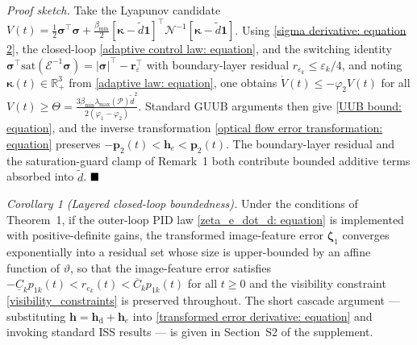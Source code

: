 \textit{Proof sketch.} Take the Lyapunov candidate $V(t) = \tfrac12\boldsymbol{\sigma}^\top\boldsymbol{\sigma} + \tfrac{\beta_{\min}}{2}[\boldsymbol{\kappa}-\tilde{d}\boldsymbol{1}]^\top\mathcal{N}^{-1}[\boldsymbol{\kappa}-\tilde{d}\boldsymbol{1}]$. Using \eqref{sigma derivative: equation 2}, the closed-loop \eqref{adaptive control law: equation}, and the switching identity $\boldsymbol{\sigma}^\top\text{sat}(\mathcal{E}^{-1}\boldsymbol{\sigma}) = |\boldsymbol{\sigma}|^\top - \boldsymbol{r}_\varepsilon^\top$ with boundary-layer residual $r_{\varepsilon_k}\le\varepsilon_k/4$, and noting $\boldsymbol{\kappa}(t)\in\mathbb{R}_+^3$ from \eqref{adaptive law: equation}, one obtains $\dot{V}(t)\le -\varphi_2 V(t)$ for all $V(t)\ge\Theta=\tfrac{3\beta_{\min}\lambda_{\max}(\mathcal{P})\tilde{d}^2}{2(\varphi_1-\varphi_2)}$. Standard GUUB arguments then give \eqref{UUB bound: equation}, and the inverse transformation \eqref{optical flow error transformation: equation} preserves $-\boldsymbol{p}_2(t)<\boldsymbol{h}_e<\boldsymbol{p}_2(t)$. The boundary-layer residual and the saturation-guard clamp of Remark~1 both contribute bounded additive terms absorbed into $\tilde{d}$. $\hfill\blacksquare$

\textit{Corollary 1 (Layered closed-loop boundedness).} Under the conditions of Theorem~1, if the outer-loop PID law \eqref{zeta_e_dot_d: equation} is implemented with positive-definite gains, the transformed image-feature error $\boldsymbol{\zeta}_1$ converges exponentially into a residual set whose size is upper-bounded by an affine function of $\vartheta$, so that the image-feature error satisfies $-\underline{C}_k p_{1k}(t)<\hat{r}_{e_k}(t)<\overline{C}_k p_{1k}(t)$ for all $t\ge 0$ and the visibility constraint \eqref{visibility_constraints} is preserved throughout. The short cascade argument --- substituting $\boldsymbol{h}=\boldsymbol{h}_\text{d}+\boldsymbol{h}_e$ into \eqref{transformed error derivative: equation} and invoking standard ISS results \cite{khalil2002} --- is given in Section~S2 of the supplement.